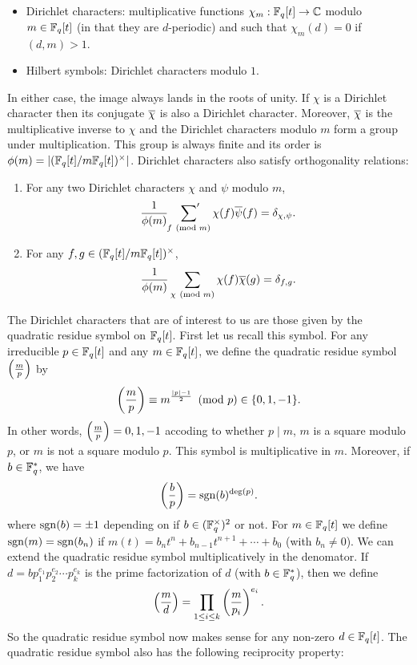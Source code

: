 \documentclass[12pt,reqno,oneside]{amsart}
\begin{document}
    \begin{itemize}
        \item Dirichlet characters: multiplicative functions $\chi_{m}:\mathbb{F}_{q}[t] \to \mathbb{C}$ modulo $m \in \mathbb{F}_{q}[t]$ (in that they are $d$-periodic) and such that $\chi_{m}(d) = 0$ if $(d,m) > 1$.
        \item Hilbert symbols: Dirichlet characters modulo $1$.
    \end{itemize}
    
    In either case, the image always lands in the roots of unity. If $\chi$ is a Dirichlet character then its conjugate $\overline{\chi}$ is also a Dirichlet character. Moreover, $\overline{\chi}$ is the multiplicative inverse to $\chi$ and the Dirichlet characters modulo $m$ form a group under multiplication. This group is always finite and its order is $\phi(m) = |(\mathbb{F}_{q}[t]/m\mathbb{F}_{q}[t])^{\times}|$. Dirichlet characters also satisfy orthogonality relations:

    \begin{theorem}
        \phantom{ }
        \begin{enumerate}[label=(\roman*)]
          \item For any two Dirichlet characters $\chi$ and $\psi$ modulo $m$,
          \[
            \frac{1}{\phi(m)}\sideset{}{'}\sum_{f \ \left(\text{mod }m\right)}\chi(f)\overline{\psi}(f) = \delta_{\chi,\psi}.
          \]
          \item For any $f,g \in (\mathbb{F}_{q}[t]/m\mathbb{F}_{q}[t])^{\times}$,
          \[
            \frac{1}{\phi(m)}\sum_{\chi \ \left(\text{mod }m\right)}\chi(f)\overline{\chi}(g) = \delta_{f,g}.
          \]
        \end{enumerate}
    \end{theorem}

    The Dirichlet characters that are of interest to us are those given by the quadratic residue symbol on $\mathbb{F}_{q}[t]$. First let us recall this symbol. For any irreducible $p \in \mathbb{F}_{q}[t]$ and any $m \in \mathbb{F}_{q}[t]$, we define the quadratic residue symbol $\textstyle{\left(\frac{m}{p}\right)}$ by
    \[
        \left(\frac{m}{p}\right) \equiv m^{\frac{|p|-1}{2}} \ \left(\text{mod }p\right) \in \{0,1,-1\}.
    \]
    In other words, $\textstyle{\left(\frac{m}{p}\right)} = 0,1,-1$ accoding to whether $p \mid m$, $m$ is a square modulo $p$, or $m$ is not a square modulo $p$. This symbol is multiplicative in $m$. Moreover, if $b \in \mathbb{F}_{q}^{\ast}$, we have
    \[
        \left(\frac{b}{p}\right) = \operatorname{\mathrm{sgn}}(b)^{\deg(p)}.
    \]
    where $\operatorname{\mathrm{sgn}}(b) = \pm1$ depending on if $b \in (\mathbb{F}_{q}^{\times})^{2}$ or not. For $m \in \mathbb{F}_{q}[t]$ we define $\operatorname{\mathrm{sgn}}(m) = \operatorname{\mathrm{sgn}}(b_{n})$ if $m(t) = b_{n}t^{n}+b_{n-1}t^{n+1}+\cdots+b_{0}$ (with $b_{n} \neq 0$). We can extend the quadratic residue symbol multiplicatively in the denomator. If $d = bp_{1}^{e_{1}}p_{2}^{e_{2}} \cdots p_{k}^{e_{k}}$ is the prime factorization of $d$ (with $b \in \mathbb{F}_{q}^{\ast}$), then we define
    \[
        \left(\frac{m}{d}\right) = \prod_{1 \le i \le k}\left(\frac{m}{p_{i}}\right)^{e_{i}}.
    \]
    So the quadratic residue symbol now makes sense for any non-zero $d \in \mathbb{F}_{q}[t]$. The quadratic residue symbol also has the following reciprocity property:
\end{document}

